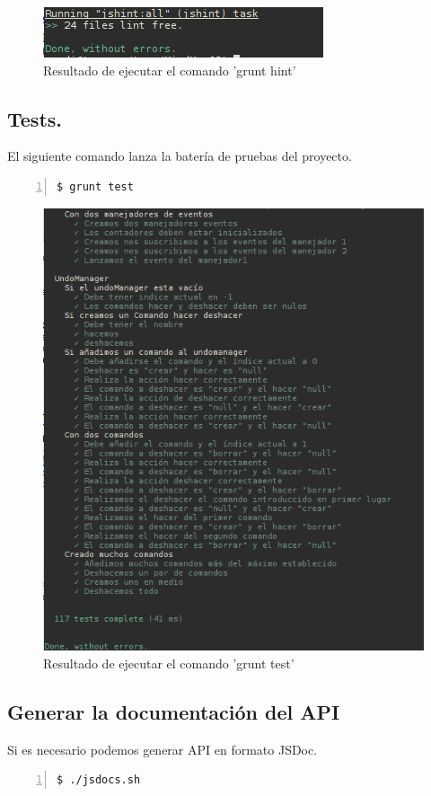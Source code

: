 \begin{figure}[tbph]
\centering
\includegraphics[width=0.5\linewidth]{imagenes/grunt-hint}
\caption{Resultado de ejecutar el comando 'grunt hint'}
\label{fig:grunt-hint}
\end{figure}

\subsection{Tests.}
El siguiente comando lanza la batería de pruebas del proyecto.

\begin{lstlisting}[language=bash, numbers=left]
$ grunt test
\end{lstlisting}

\begin{figure}[tbph]
\centering
\includegraphics[width=0.5\linewidth]{imagenes/grunt-test}
\caption{Resultado de ejecutar el comando 'grunt test'}
\label{fig:grunt-test}
\end{figure}


\subsection{Generar la documentación del API}

Si es necesario podemos generar API en formato JSDoc. 

\begin{lstlisting}[language=bash, numbers=left]
$ ./jsdocs.sh 
\end{lstlisting}
